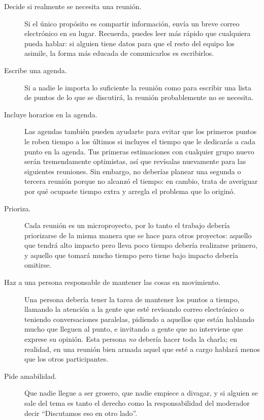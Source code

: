 \begin{description}

\item[Decide si realmente se necesita una reunión.]
  Si el único propósito es compartir información,
  envía un breve correo electrónico en su lugar.
  Recuerda,
  puedes leer más rápido que cualquiera pueda hablar:
  si alguien tiene datos para que el resto del equipo los asimile,
  la forma más educada de comunicarlos es escribirlos.

\item[Escribe una agenda.]
  Si a nadie le importa lo suficiente la reunión como para escribir una lista de puntos
  de lo que se discutirá,
  la reunión probablemente no se necesita.

\item[Incluye horarios en la agenda.]
  Las agendas también pueden ayudarte para evitar que los primeros puntos le roben tiempo a los últimos
  si incluyes el tiempo que le dedicarás a cada punto en la agenda.
  Tus primeras estimaciones con cualquier grupo nuevo serán tremendamente optimistas,
  así que revísalas nuevamente para las siguientes reuniones.
  Sin embargo,
  no deberías planear una segunda o tercera reunión
  porque no alcanzó el tiempo:
  en cambio,
  trata de averiguar por qué ocupaste tiempo extra y arregla el problema que lo originó. 

\item[Prioriza.]
  Cada reunión es un microproyecto,
  por lo tanto el trabajo debería priorizarse de la misma manera que se hace para otros proyectos:
  aquello que tendrá alto impacto pero lleva poco tiempo debería realizarse primero,
  y aquello que tomará mucho tiempo pero tiene bajo impacto debería omitirse.

\item[Haz a una persona responsable de mantener las cosas en movimiento.]
  Una persona debería tener la tarea de mantener los puntos a tiempo,
  llamando la atención a la gente que esté revisando correo electrónico o  teniendo  conversaciones paralelas,
  pidiendo a aquellos que están hablando mucho que lleguen al punto,
  e invitando a gente que no interviene que exprese su opinión.
  Esta persona \emph{no} debería hacer toda la charla;
  en realidad, 
  en una reunión bien armada aquel que esté a cargo hablará menos 
  que los otros participantes.

\item[Pide amabilidad.]
  Que nadie llegue a ser grosero,
  que nadie empiece a divagar,
  y si alguien se sale del tema
  es tanto el derecho como la responsabilidad del moderador decir
  ``Discutamos eso en otro lado''.


\end{description}
